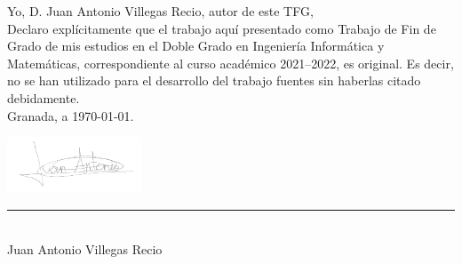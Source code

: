 \noindent Yo, D. Juan Antonio Villegas Recio, autor de este TFG, \\
\newline
Declaro explícitamente que el trabajo aquí presentado como Trabajo de Fin de Grado de mis estudios en el Doble Grado en Ingeniería Informática y Matemáticas, correspondiente al curso académico 2021--2022, es original. Es decir, no se han utilizado para el desarrollo del trabajo fuentes sin haberlas citado debidamente. \\
\newline
Granada, a \today.

\vspace{0cm}
\noindent\includegraphics[width=0.3\textwidth]{img/firma.png}

\vspace*{-1.1cm}
\noindent \rule{0.3\textwidth}{.3pt}\\
\vspace{0.3cm}
\noindent \large{Juan Antonio Villegas Recio}